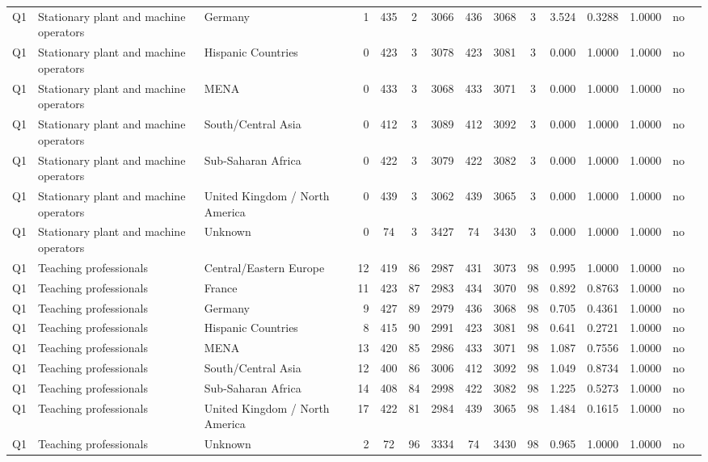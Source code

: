 \begin{longtable}{lllrcccccccccll}
Q1 & Stationary plant and machine operators & Germany & 1 & 435 & 2 & 3066 & 436 & 3068 & 3 & 3.524 & 0.3288 & 1.0000 & no \\
Q1 & Stationary plant and machine operators & Hispanic Countries & 0 & 423 & 3 & 3078 & 423 & 3081 & 3 & 0.000 & 1.0000 & 1.0000 & no \\
Q1 & Stationary plant and machine operators & MENA & 0 & 433 & 3 & 3068 & 433 & 3071 & 3 & 0.000 & 1.0000 & 1.0000 & no \\
Q1 & Stationary plant and machine operators & South/Central Asia & 0 & 412 & 3 & 3089 & 412 & 3092 & 3 & 0.000 & 1.0000 & 1.0000 & no \\
Q1 & Stationary plant and machine operators & Sub-Saharan Africa & 0 & 422 & 3 & 3079 & 422 & 3082 & 3 & 0.000 & 1.0000 & 1.0000 & no \\
Q1 & Stationary plant and machine operators & United Kingdom / North America & 0 & 439 & 3 & 3062 & 439 & 3065 & 3 & 0.000 & 1.0000 & 1.0000 & no \\
Q1 & Stationary plant and machine operators & Unknown & 0 & 74 & 3 & 3427 & 74 & 3430 & 3 & 0.000 & 1.0000 & 1.0000 & no \\
Q1 & Teaching professionals & Central/Eastern Europe & 12 & 419 & 86 & 2987 & 431 & 3073 & 98 & 0.995 & 1.0000 & 1.0000 & no \\
Q1 & Teaching professionals & France & 11 & 423 & 87 & 2983 & 434 & 3070 & 98 & 0.892 & 0.8763 & 1.0000 & no \\
Q1 & Teaching professionals & Germany & 9 & 427 & 89 & 2979 & 436 & 3068 & 98 & 0.705 & 0.4361 & 1.0000 & no \\
Q1 & Teaching professionals & Hispanic Countries & 8 & 415 & 90 & 2991 & 423 & 3081 & 98 & 0.641 & 0.2721 & 1.0000 & no \\
Q1 & Teaching professionals & MENA & 13 & 420 & 85 & 2986 & 433 & 3071 & 98 & 1.087 & 0.7556 & 1.0000 & no \\
Q1 & Teaching professionals & South/Central Asia & 12 & 400 & 86 & 3006 & 412 & 3092 & 98 & 1.049 & 0.8734 & 1.0000 & no \\
Q1 & Teaching professionals & Sub-Saharan Africa & 14 & 408 & 84 & 2998 & 422 & 3082 & 98 & 1.225 & 0.5273 & 1.0000 & no \\
Q1 & Teaching professionals & United Kingdom / North America & 17 & 422 & 81 & 2984 & 439 & 3065 & 98 & 1.484 & 0.1615 & 1.0000 & no \\
Q1 & Teaching professionals & Unknown & 2 & 72 & 96 & 3334 & 74 & 3430 & 98 & 0.965 & 1.0000 & 1.0000 & no \\

\end{longtable}
